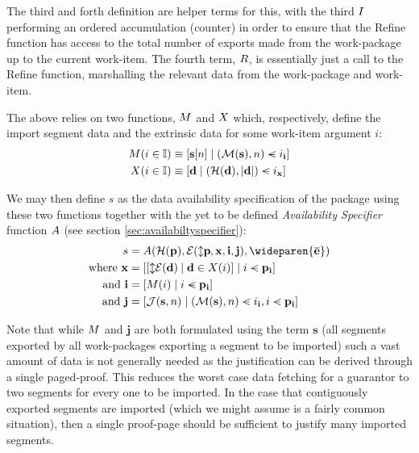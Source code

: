 The third and forth definition are helper terms for this, with the third $I$ performing an ordered accumulation (\ie counter) in order to ensure that the Refine function has access to the total number of exports made from the work-package up to the current work-item. The fourth term, $R$, is essentially just a call to the Refine function, marshalling the relevant data from the work-package and work-item.


The above relies on two functions, $M$ and $X$ which, respectively, define the import segment data and the extrinsic data for some work-item argument $i$:
\begin{equation}
  \begin{aligned}
    \importsegmentdata(i \in \mathbb{I}) &\equiv [\mathbf{s}[n] \mid (\mathcal{M}(\mathbf{s}), n) \orderedin i_\mathbf{i}] \\
    \extrinsicdata(i \in \mathbb{I}) &\equiv [\mathbf{d} \mid (\mathcal{H}(\mathbf{d}), |\mathbf{d}|) \orderedin i_\mathbf{x}]
  \end{aligned}
\end{equation}

We may then define $s$ as the data availability specification of the package using these two functions together with the yet to be defined \emph{Availability Specifier} function $A$ (see section \ref{sec:availabiltyspecifier}):
\begin{equation}
  \begin{aligned}
    s &= \newavailabilityspecifier(\mathcal{H}(\mathbf{p}), \se(\var{\mathbf{p}}, \mathbf{x}, \mathbf{i}, \mathbf{j}), \wideparen{\overline{\mathbf{e}}}) \\
    \nonumber \where \mathbf{x} &= [[\var{\se(\mathbf{d})} \mid \mathbf{d} \in \extrinsicdata(i)] \mid i \orderedin \mathbf{p}_\mathbf{i}]\\
    \nonumber \also \mathbf{i} &= [\importsegmentdata(i) \mid i \orderedin \mathbf{p}_\mathbf{i}]\\
    \nonumber \also \mathbf{j} &= [\mathcal{J}(\mathbf{s}, n) \mid (\mathcal{M}(\mathbf{s}), n) \orderedin i_\mathbf{i}, i \orderedin \mathbf{p}_\mathbf{i}]
  \end{aligned}
\end{equation}

Note that while $M$ and $\mathbf{j}$ are both formulated using the term $\mathbf{s}$ (all segments exported by all work-packages exporting a segment to be imported) such a vast amount of data is not generally needed as the justification can be derived through a single paged-proof. This reduces the worst case data fetching for a guarantor to two segments for every one to be imported. In the case that contiguously exported segments are imported (which we might assume is a fairly common situation), then a single proof-page should be sufficient to justify many imported segments.

